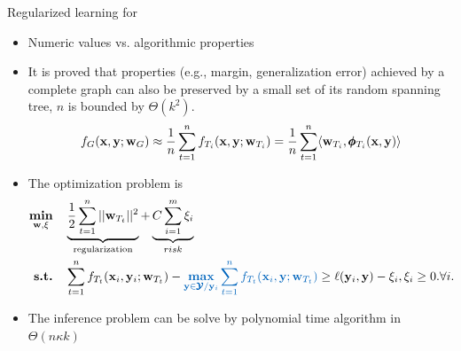 \documentclass[first=dgreen,second=purple,logo=yellowexc]{aaltoslides}
\begin{document}
{\begin{frame}{Regularized learning for \rta}
	\begin{itemize}
		\item Numeric values vs. algorithmic properties 
		\item It is proved that properties (e.g., margin, generalization error) achieved by a complete graph can also be preserved by a small set of its random spanning tree, $n$ is bounded by $\Theta(k^2)$.
		\begin{align*}
			f_G(\mathbf {x},\mathbf {y};\mathbf {w}_G) \approx \frac{1}{n}\sum_{t=1}^nf_{T_i}(\mathbf {x},\mathbf {y};\mathbf {w}_{T_i}) = \frac{1}{n}\sum_{t=1}^n\langle \mathbf {w}_{T_i}, \pmb \phi_{T_i}(\mathbf {x},\mathbf {y}) \rangle
		\end{align*}
		\item The optimization problem is 
		\begin{align*}
			\underset{\vw,\vxi}{\minimize} &\quad \underbrace{\frac{1}{2}\sum_{t=1}^{n}||\vw_{T_t}||^2}_{\text{regularization}} + \underbrace{C\sum_{i=1}^m\xi_i}_{risk}\\
			\st &\quad \sum_{t=1}^{n}f_{T_t}(\vx_i,\vy_i;\vw_{T_t}) - {\color{aaltoblue}\underset{\vy\in\vYcal/\vy_i}{\maximize}\sum_{t=1}^{n}f_{T_t}(\vx_i,\vy;\vw_{T_t})} \ge \ell(\vy_i,\vy) - \xi_i,\xi_i\ge0.\forall i.
		\end{align*}
		\item The inference problem can be solve by polynomial time algorithm in $\Theta(n\kappa k)$
	\end{itemize}
\end{frame}


}
\end{document}
